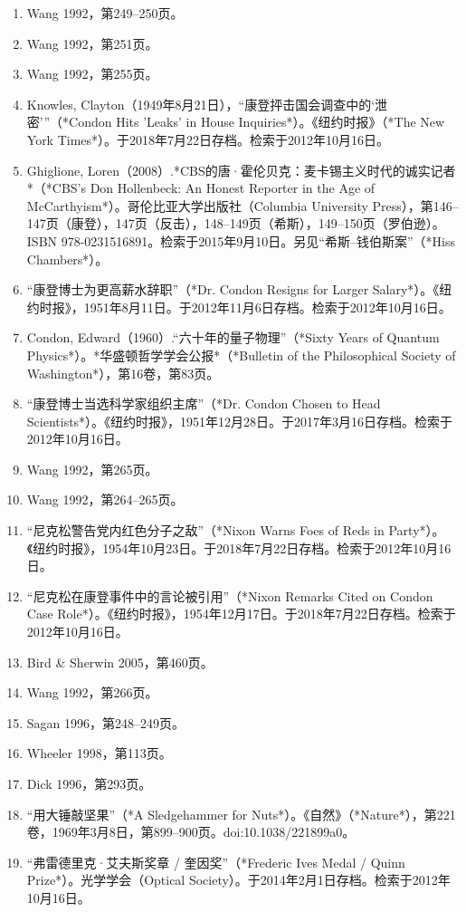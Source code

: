\begin{enumerate}
\item Wang 1992，第249–250页。
\item Wang 1992，第251页。
\item Wang 1992，第255页。
\item Knowles, Clayton（1949年8月21日），“康登抨击国会调查中的‘泄密’”（*Condon Hits 'Leaks' in House Inquiries*）。《纽约时报》（*The New York Times*）。于2018年7月22日存档。检索于2012年10月16日。
\item Ghiglione, Loren（2008）.*CBS的唐·霍伦贝克：麦卡锡主义时代的诚实记者*（*CBS's Don Hollenbeck: An Honest Reporter in the Age of McCarthyism*）。哥伦比亚大学出版社（Columbia University Press），第146–147页（康登），147页（反击），148–149页（希斯），149–150页（罗伯逊）。ISBN 978-0231516891。检索于2015年9月10日。另见“希斯–钱伯斯案”（*Hiss Chambers*）。
\item “康登博士为更高薪水辞职”（*Dr. Condon Resigns for Larger Salary*）。《纽约时报》，1951年8月11日。于2012年11月6日存档。检索于2012年10月16日。
\item Condon, Edward（1960）.“六十年的量子物理”（*Sixty Years of Quantum Physics*）。*华盛顿哲学学会公报*（*Bulletin of the Philosophical Society of Washington*），第16卷，第83页。
\item “康登博士当选科学家组织主席”（*Dr. Condon Chosen to Head Scientists*）。《纽约时报》，1951年12月28日。于2017年3月16日存档。检索于2012年10月16日。
\item Wang 1992，第265页。
\item Wang 1992，第264–265页。
\item “尼克松警告党内红色分子之敌”（*Nixon Warns Foes of Reds in Party*）。《纽约时报》，1954年10月23日。于2018年7月22日存档。检索于2012年10月16日。
\item “尼克松在康登事件中的言论被引用”（*Nixon Remarks Cited on Condon Case Role*）。《纽约时报》，1954年12月17日。于2018年7月22日存档。检索于2012年10月16日。
\item Bird & Sherwin 2005，第460页。
\item Wang 1992，第266页。
\item Sagan 1996，第248–249页。
\item Wheeler 1998，第113页。
\item Dick 1996，第293页。
\item “用大锤敲坚果”（*A Sledgehammer for Nuts*）。《自然》（*Nature*），第221卷，1969年3月8日，第899–900页。doi:10.1038/221899a0。
\item “弗雷德里克·艾夫斯奖章 / 奎因奖”（*Frederic Ives Medal / Quinn Prize*）。光学学会（Optical Society）。于2014年2月1日存档。检索于2012年10月16日。

\end{enumerate}
